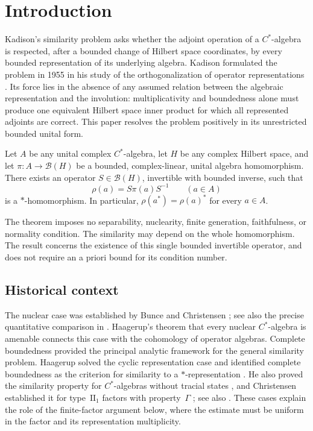 \section{Introduction}
\label{sec:introduction}

Kadison's similarity problem asks whether the adjoint operation of a
\(C^*\)-algebra is respected, after a bounded change of Hilbert space
coordinates, by every bounded representation of its underlying algebra.
Kadison formulated the problem in 1955 in his study of the
orthogonalization of operator representations \citep{Kadison1955}.
Its force lies in the absence of any assumed relation between the
algebraic representation and the involution: multiplicativity and
boundedness alone must produce one equivalent Hilbert space inner
product for which all represented adjoints are correct.  This paper
resolves the problem positively in its unrestricted bounded unital form.

\begin{theorem}[Similarity]\label{thm:similarity}
Let \(A\) be any unital complex \(C^*\)-algebra, let \(H\) be any complex
Hilbert space, and let \(\pi:A\to\mathcal B(H)\) be a bounded,
complex-linear, unital algebra homomorphism.  There exists an operator
\(S\in\mathcal B(H)\), invertible with bounded inverse, such that
\[
  \rho(a)=S\pi(a)S^{-1}\qquad(a\in A)
\]
is a \(*\)-homomorphism.  In particular,
\(\rho(a^*)=\rho(a)^*\) for every \(a\in A\).
\end{theorem}

The theorem imposes no separability, nuclearity, finite generation,
faithfulness, or normality condition.  The similarity may depend on the
whole homomorphism.  The result concerns the existence of this single
bounded invertible operator, and does not require an a priori bound for
its condition number.

\subsection{Historical context}

The nuclear case was established by Bunce and Christensen
\citep{Bunce1981,Christensen1981}; see also the precise quantitative
comparison in \citet[Theorem~1]{Pisier2006Nuclear}.
Haagerup's theorem that every nuclear $C^*$-algebra is amenable
\citep[Theorem~3.1]{Haagerup1983Amenable} connects this case with the
cohomology of operator algebras. Complete boundedness provided the
principal analytic framework for the general similarity problem.
Haagerup solved the cyclic representation case and identified
complete boundedness as the criterion for similarity to a
\(*\)-representation \citep{Haagerup1983}. He also proved the similarity
property for $C^*$-algebras without tracial states
\citep[Proposition~1.8]{Haagerup1983}, and Christensen established it
for type~\(\mathrm{II}_1\) factors with property~\(\Gamma\)
\citep{Christensen1986}; see also
\citet[Section~1.2, Theorem~1.3]{Ozawa2006}. These cases explain the role
of the finite-factor argument below, where the estimate must be uniform
in the factor and its representation multiplicity.

